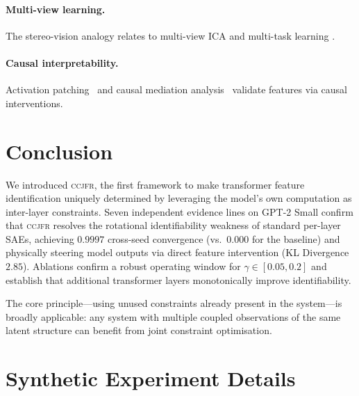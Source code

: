 \documentclass[12pt,a4paper]{article}
\newcommand{\CCJFR}{\textsc{ccjfr}}
\begin{document}
\paragraph{Multi-view learning.}
The stereo-vision analogy relates to multi-view ICA \citep{hyvarinen2001independent}
and multi-task learning \citep{caruana1997multitask}.

\paragraph{Causal interpretability.}
Activation patching~\citep{meng2022locating} and causal mediation
analysis~\citep{vig2020investigating} validate features via causal interventions.

\section{Conclusion}
\label{sec:conclusion}

We introduced \CCJFR{}, the first framework to make transformer feature
identification uniquely determined by leveraging the model's own computation
as inter-layer constraints. Seven independent evidence lines on GPT-2 Small
confirm that \CCJFR{} resolves the rotational identifiability weakness of
standard per-layer SAEs, achieving $0.9997$ cross-seed convergence (vs.\ $0.000$
for the baseline) and physically steering model outputs via direct feature intervention (KL Divergence $2.85$).
Ablations confirm a robust operating window for $\gamma \in [0.05, 0.2]$ and
establish that additional transformer layers monotonically improve identifiability.

The core principle—using unused constraints already present in the system—is
broadly applicable: any system with multiple coupled observations of the same
latent structure can benefit from joint constraint optimisation.

\appendix

\section{Synthetic Experiment Details}
\label{app:synthetic_details}
\end{document}
